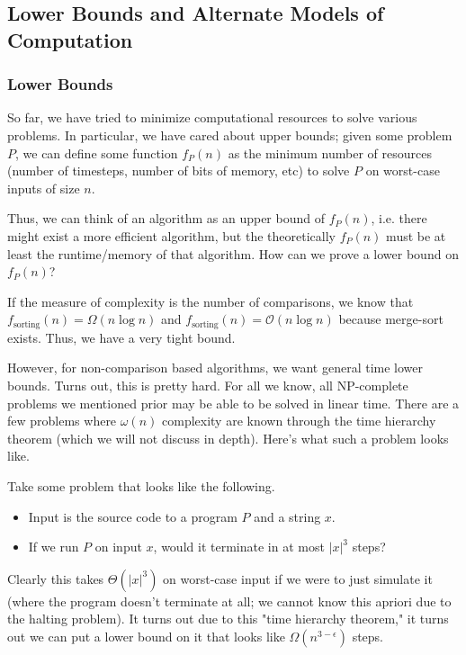 \subsection{Lower Bounds and Alternate Models of Computation}
\subsubsection{Lower Bounds}

So far, we have tried to minimize computational resources to solve various problems.
In particular, we have cared about upper bounds; given some problem $P$, we can define some function $f_P(n)$
as the minimum number of resources (number of timesteps, number of bits of memory, etc) to solve $P$ on worst-case inputs of size $n$.

Thus, we can think of an algorithm as an upper bound of $f_P(n)$, i.e. there might exist a more efficient algorithm,
but the theoretically $f_P(n)$ must be at least the runtime/memory of that algorithm. How can we prove a lower bound on $f_P(n)$?

If the measure of complexity is the number of comparisons, we know that $f_{\text{sorting}}(n) = \Omega(n \log n)$
and $f_{\text{sorting}}(n) = \mathcal{O}(n \log n)$ because merge-sort exists. Thus, we have a very tight bound.

However, for non-comparison based algorithms, we want general time lower bounds. Turns out, this is pretty hard. For all we know, all NP-complete problems we mentioned prior may be able to be solved in linear time.
There are a few problems where $\omega(n)$ complexity are known through the time hierarchy theorem (which we will not discuss in depth). Here's what such a problem looks like.

\begin{example}
    Take some problem that looks like the following.
    \begin{itemize}
        \item Input is the source code to a program $P$ and a string $x$.
        \item If we run $P$ on input $x$, would it terminate in at most $|x|^3$ steps?
    \end{itemize}
    Clearly this takes $\Theta(|x|^3)$ on worst-case input if we were to just simulate it (where the program doesn't terminate at all; we cannot know this apriori due to the halting problem).
    It turns out due to this "time hierarchy theorem," it turns out we can put a lower bound on it that looks like $\Omega(n^{3 - \epsilon})$ steps.
\end{example}

